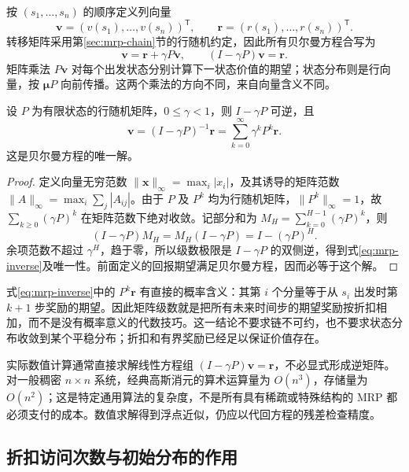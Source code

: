 \documentclass[UTF8]{ctexart}
\begin{document}
按 $(s_1,\ldots,s_n)$ 的顺序定义列向量
\[
  \boldsymbol v=(v(s_1),\ldots,v(s_n))^{\mathsf T},\qquad
  \boldsymbol r=(r(s_1),\ldots,r(s_n))^{\mathsf T}.
\]
转移矩阵采用第\ref{sec:mrp-chain}节的行随机约定，因此所有贝尔曼方程合写为
\begin{equation}
  \boldsymbol v=\boldsymbol r+\gamma P\boldsymbol v,
  \qquad (I-\gamma P)\boldsymbol v=\boldsymbol r.
  \label{eq:mrp-linear-system}
\end{equation}
矩阵乘法 $P\boldsymbol v$ 对每个出发状态分别计算下一状态价值的期望；状态分布则是行向量，按 $\boldsymbol\mu P$ 向前传播。这两个乘法的方向不同，来自向量含义不同。

\begin{theorem}[折扣价值的唯一解]
\label{thm:mrp-inverse}
设 $P$ 为有限状态的行随机矩阵，$0\leq\gamma<1$，则 $I-\gamma P$ 可逆，且
\begin{equation}
  \boldsymbol v=(I-\gamma P)^{-1}\boldsymbol r
  =\sum_{k=0}^{\infty}\gamma^kP^k\boldsymbol r.
  \label{eq:mrp-inverse}
\end{equation}
这是贝尔曼方程的唯一解。
\end{theorem}

\begin{proof}
定义向量无穷范数 $\|\boldsymbol x\|_\infty=\max_i|x_i|$，及其诱导的矩阵范数 $\|A\|_\infty=\max_i\sum_j|A_{ij}|$。由于 $P$ 及 $P^k$ 均为行随机矩阵，$\|P^k\|_\infty=1$，故 $\sum_{k\geq0}(\gamma P)^k$ 在矩阵范数下绝对收敛。记部分和为 $M_H=\sum_{k=0}^{H-1}(\gamma P)^k$，则
\[
  (I-\gamma P)M_H=M_H(I-\gamma P)=I-(\gamma P)^H.
\]
余项范数不超过 $\gamma^H$，趋于零，所以级数极限是 $I-\gamma P$ 的双侧逆，得到式\eqref{eq:mrp-inverse}及唯一性。前面定义的回报期望满足贝尔曼方程，因而必等于这个解。
\end{proof}

式\eqref{eq:mrp-inverse}中的 $P^k\boldsymbol r$ 有直接的概率含义：其第 $i$ 个分量等于从 $s_i$ 出发时第 $k+1$ 步奖励的期望。因此矩阵级数就是把所有未来时间步的期望奖励按折扣相加，而不是没有概率意义的代数技巧。这一结论不要求链不可约，也不要求状态分布收敛到某个平稳分布；折扣和有界奖励已经足以保证价值存在。

实际数值计算通常直接求解线性方程组 $(I-\gamma P)\boldsymbol v=\boldsymbol r$，不必显式形成逆矩阵。对一般稠密 $n\times n$ 系统，经典高斯消元的算术运算量为 $O(n^3)$，存储量为 $O(n^2)$；这是特定通用算法的复杂度，不是所有具有稀疏或特殊结构的 MRP 都必须支付的成本。数值求解得到浮点近似，仍应以代回方程的残差检查精度。

\subsection{折扣访问次数与初始分布的作用}
\end{document}
